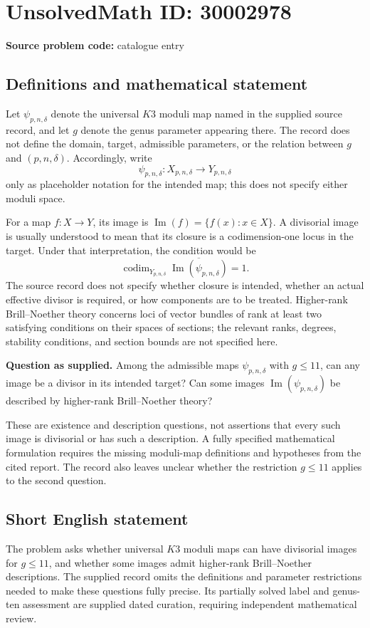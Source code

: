 \documentclass[11pt]{article}
\begin{document}
\section*{UnsolvedMath ID: 30002978}
\textbf{Source problem code:} catalogue entry
\subsection{Definitions and mathematical statement}
Let \(\psi_{p,n,\delta}\) denote the universal \(K3\) moduli map named in the supplied source record, and let \(g\) denote the genus parameter appearing there. The record does not define the domain, target, admissible parameters, or the relation between \(g\) and \((p,n,\delta)\). Accordingly, write
\[
\psi_{p,n,\delta}\colon X_{p,n,\delta}\longrightarrow Y_{p,n,\delta}
\]
only as placeholder notation for the intended map; this does not specify either moduli space.

For a map \(f\colon X\to Y\), its image is \(\operatorname{Im}(f)=\{f(x):x\in X\}\). A divisorial image is usually understood to mean that its closure is a codimension-one locus in the target. Under that interpretation, the condition would be
\[
\operatorname{codim}_{Y_{p,n,\delta}}
\overline{\operatorname{Im}(\psi_{p,n,\delta})}=1.
\]
The source record does not specify whether closure is intended, whether an actual effective divisor is required, or how components are to be treated. Higher-rank Brill--Noether theory concerns loci of vector bundles of rank at least two satisfying conditions on their spaces of sections; the relevant ranks, degrees, stability conditions, and section bounds are not specified here.

\textbf{Question as supplied.} Among the admissible maps \(\psi_{p,n,\delta}\) with \(g\leq 11\), can any image be a divisor in its intended target? Can some images \(\operatorname{Im}(\psi_{p,n,\delta})\) be described by higher-rank Brill--Noether theory?

These are existence and description questions, not assertions that every such image is divisorial or has such a description. A fully specified mathematical formulation requires the missing moduli-map definitions and hypotheses from the cited report. The record also leaves unclear whether the restriction \(g\leq 11\) applies to the second question.
\subsection{Short English statement}
The problem asks whether universal \(K3\) moduli maps can have divisorial images for \(g\leq 11\), and whether some images admit higher-rank Brill--Noether descriptions. The supplied record omits the definitions and parameter restrictions needed to make these questions fully precise. Its partially solved label and genus-ten assessment are supplied dated curation, requiring independent mathematical review.
\end{document}
